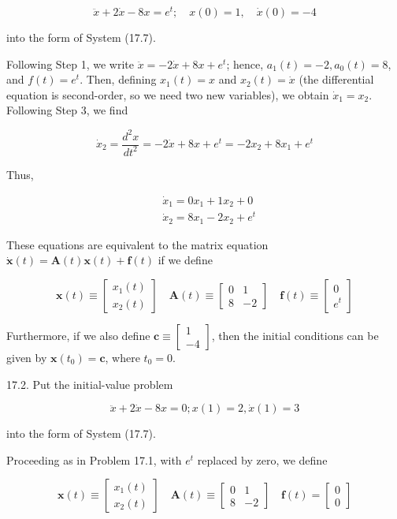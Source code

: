 \documentclass[10pt]{article}
\begin{document}
$$
\ddot{x}+2 \dot{x}-8 x=e^{t} ; \quad x(0)=1, \quad \dot{x}(0)=-4
$$

into the form of System (17.7).

Following Step 1, we write $\ddot{x}=-2 \dot{x}+8 x+e^{t}$; hence, $a_{1}(t)=-2, a_{0}(t)=8$, and $f(t)=e^{t}$. Then, defining $x_{1}(t)=x$ and $x_{2}(t)=\dot{x}$ (the differential equation is second-order, so we need two new variables), we obtain $\dot{x}_{1}=x_{2}$. Following Step 3, we find

$$
\dot{x}_{2}=\frac{d^{2} x}{d t^{2}}=-2 \dot{x}+8 x+e^{t}=-2 x_{2}+8 x_{1}+e^{t}
$$

Thus,

$$
\begin{aligned}
& \dot{x}_{1}=0 x_{1}+1 x_{2}+0 \\
& \dot{x}_{2}=8 x_{1}-2 x_{2}+e^{t}
\end{aligned}
$$

These equations are equivalent to the matrix equation $\dot{\mathbf{x}}(t)=\mathbf{A}(t) \mathbf{x}(t)+\mathbf{f}(t)$ if we define

$$
\mathbf{x}(t) \equiv\left[\begin{array}{l}
x_{1}(t) \\
x_{2}(t)
\end{array}\right] \quad \mathbf{A}(t) \equiv\left[\begin{array}{rr}
0 & 1 \\
8 & -2
\end{array}\right] \quad \mathbf{f}(t) \equiv\left[\begin{array}{l}
0 \\
e^{t}
\end{array}\right]
$$

Furthermore, if we also define $\mathbf{c} \equiv\left[\begin{array}{r}1 \\ -4\end{array}\right]$, then the initial conditions can be given by $\mathbf{x}\left(t_{0}\right)=\mathbf{c}$, where $t_{0}=0$.

17.2. Put the initial-value problem

$$
\ddot{x}+2 \dot{x}-8 x=0 ; x(1)=2, \dot{x}(1)=3
$$

into the form of System (17.7).

Proceeding as in Problem 17.1, with $e^{t}$ replaced by zero, we define

$$
\mathbf{x}(t) \equiv\left[\begin{array}{l}
x_{1}(t) \\
x_{2}(t)
\end{array}\right] \quad \mathbf{A}(t) \equiv\left[\begin{array}{rr}
0 & 1 \\
8 & -2
\end{array}\right] \quad \mathbf{f}(t)=\left[\begin{array}{l}
0 \\
0
\end{array}\right]
$$
\end{document}
